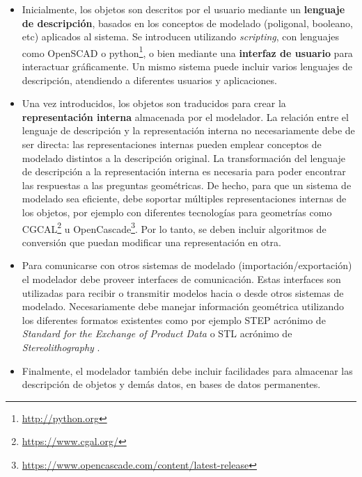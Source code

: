 \begin{itemize}
\item Inicialmente, 
los objetos son descritos por el usuario mediante un \textbf{lenguaje de descripción}, basados en los conceptos de modelado (poligonal, booleano, etc) aplicados al sistema. 
Se introducen utilizando \textit{scripting}, con lenguajes como OpenSCAD o python\footnote{\url{http://python.org}}, o bien mediante una \textbf{interfaz de usuario} para interactuar gráficamente. Un mismo sistema puede incluir varios lenguajes de descripción, atendiendo a diferentes usuarios y aplicaciones.

\item Una vez introducidos, los objetos son traducidos para crear la \textbf{representación interna} almacenada por el modelador. 
La relación entre el lenguaje de descripción y la representación interna no necesariamente debe de ser directa: las representaciones internas pueden emplear conceptos de modelado distintos a la descripción original. La transformación del lenguaje de descripción a la representación interna es necesaria para poder encontrar las respuestas a las preguntas geométricas. De hecho, para que un sistema de modelado sea eficiente, debe soportar múltiples representaciones internas de los objetos, por ejemplo con diferentes tecnologías para geometrías como CGCAL\footnote{\url{https://www.cgal.org/}} u OpenCascade\footnote{\url{https://www.opencascade.com/content/latest-release}}. Por lo tanto, se deben incluir algoritmos de conversión que puedan modificar una representación en otra.

 \item Para comunicarse con otros sistemas de modelado  (importación/exportación) el modelador debe proveer interfaces de comunicación. 
 Estas interfaces son utilizadas para recibir o transmitir modelos hacia o desde otros sistemas de modelado. Necesariamente debe manejar información geométrica utilizando los diferentes formatos existentes como por ejemplo STEP acrónimo de \textit{Standard for the Exchange of Product Data} \citep{Wilson1998} o STL acrónimo  de \textit{Stereolithography} \citep{grimm2004user}.

\item Finalmente, el modelador también debe incluir facilidades para almacenar las descripción de objetos y demás datos, en bases de datos permanentes. 
\end{itemize}

